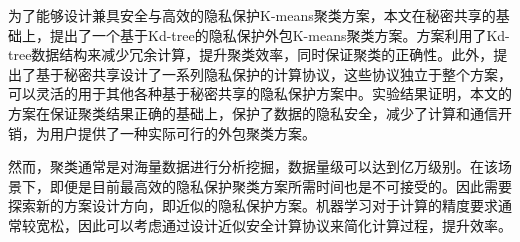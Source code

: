 为了能够设计兼具安全与高效的隐私保护K-means聚类方案，本文在秘密共享的基础上，提出了一个基于Kd-tree的隐私保护外包K-means聚类方案。方案利用了Kd-tree数据结构来减少冗余计算，提升聚类效率，同时保证聚类的正确性。此外，提出了基于秘密共享设计了一系列隐私保护的计算协议，这些协议独立于整个方案，可以灵活的用于其他各种基于秘密共享的隐私保护方案中。实验结果证明，本文的方案在保证聚类结果正确的基础上，保护了数据的隐私安全，减少了计算和通信开销，为用户提供了一种实际可行的外包聚类方案。

然而，聚类通常是对海量数据进行分析挖掘，数据量级可以达到亿万级别。在该场景下，即便是目前最高效的隐私保护聚类方案所需时间也是不可接受的。因此需要探索新的方案设计方向，即近似的隐私保护方案。机器学习对于计算的精度要求通常较宽松，因此可以考虑通过设计近似安全计算协议来简化计算过程，提升效率。